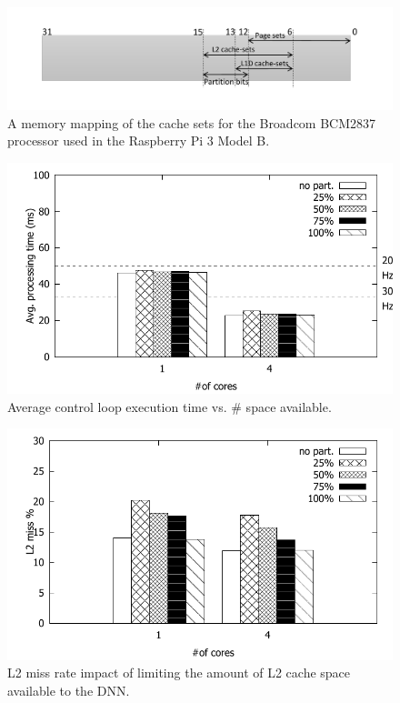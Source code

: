 \begin{figure}[h]
  \centering
  \includegraphics[width=\textwidth]{figs/cache-mapping}
  \caption{A memory mapping of the cache sets for the Broadcom 
BCM2837 processor used in the Raspberry Pi 3 Model B.}
  \label{fig:cache-mapping}
\end{figure}

\begin{figure}[h]
  \centering
  \includegraphics[width=.7\textwidth]{figs/palloc_multicore}
  \caption{Average control loop execution time vs. \# %
  space available.}
  \label{fig:palloc_multicore}
\end{figure}

\begin{figure}[h]
  \centering
  \includegraphics[width=.7\textwidth]{figs/palloc_multicore_l2missrate}
  \caption{L2 miss rate impact of limiting the amount of L2 cache space
  available to the DNN.}
  \label{fig:palloc_multicore_l2missrate}
\end{figure}

